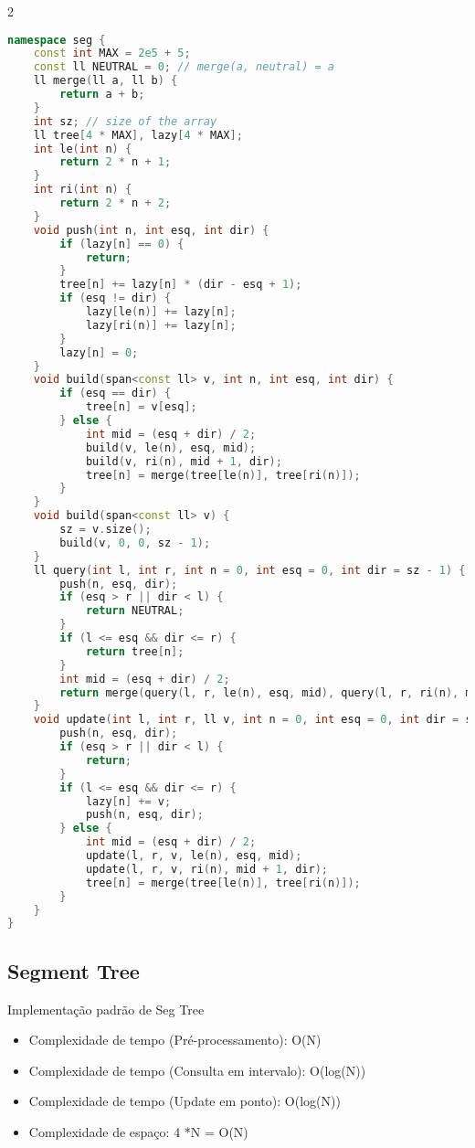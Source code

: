 \documentclass[11pt, a4paper, oneside]{book}
\begin{document}
\begin{multicols}{2}
\begin{lstlisting}[language=C++]
namespace seg {
    const int MAX = 2e5 + 5;
    const ll NEUTRAL = 0; // merge(a, neutral) = a
    ll merge(ll a, ll b) {
        return a + b;
    }
    int sz; // size of the array
    ll tree[4 * MAX], lazy[4 * MAX];
    int le(int n) {
        return 2 * n + 1;
    }
    int ri(int n) {
        return 2 * n + 2;
    }
    void push(int n, int esq, int dir) {
        if (lazy[n] == 0) {
            return;
        }
        tree[n] += lazy[n] * (dir - esq + 1);
        if (esq != dir) {
            lazy[le(n)] += lazy[n];
            lazy[ri(n)] += lazy[n];
        }
        lazy[n] = 0;
    }
    void build(span<const ll> v, int n, int esq, int dir) {
        if (esq == dir) {
            tree[n] = v[esq];
        } else {
            int mid = (esq + dir) / 2;
            build(v, le(n), esq, mid);
            build(v, ri(n), mid + 1, dir);
            tree[n] = merge(tree[le(n)], tree[ri(n)]);
        }
    }
    void build(span<const ll> v) {
        sz = v.size();
        build(v, 0, 0, sz - 1);
    }
    ll query(int l, int r, int n = 0, int esq = 0, int dir = sz - 1) {
        push(n, esq, dir);
        if (esq > r || dir < l) {
            return NEUTRAL;
        }
        if (l <= esq && dir <= r) {
            return tree[n];
        }
        int mid = (esq + dir) / 2;
        return merge(query(l, r, le(n), esq, mid), query(l, r, ri(n), mid + 1, dir));
    }
    void update(int l, int r, ll v, int n = 0, int esq = 0, int dir = sz - 1) {
        push(n, esq, dir);
        if (esq > r || dir < l) {
            return;
        }
        if (l <= esq && dir <= r) {
            lazy[n] += v;
            push(n, esq, dir);
        } else {
            int mid = (esq + dir) / 2;
            update(l, r, v, le(n), esq, mid);
            update(l, r, v, ri(n), mid + 1, dir);
            tree[n] = merge(tree[le(n)], tree[ri(n)]);
        }
    }
}
\end{lstlisting}
\end{multicols}

\hfill

\subsection{Segment Tree}
Implementação padrão de Seg Tree



\begin{itemize}
\item Complexidade de tempo (Pré-processamento): O(N)
\item Complexidade de tempo (Consulta em intervalo): O(log(N))
\item Complexidade de tempo (Update em ponto): O(log(N))
\item Complexidade de espaço: 4 *N = O(N)
\end{itemize}
\end{document}
